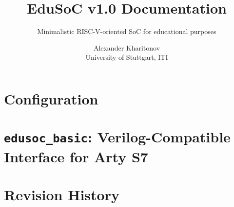\documentclass[12pt]{scrartcl}
\title{EduSoC v1.0 Documentation}
\subtitle{Minimalistic RISC-V-oriented SoC for educational purposes}
\author{Alexander Kharitonov\\University of Stuttgart, ITI}
\newcommand{\ttt}[1]{\texttt{#1}}
\begin{document}









\section{Configuration}\label{sec:config}


\appendix
\section{\ttt{edusoc\_basic}: Verilog-Compatible Interface for Arty S7}\label{sec:basic}


\section{Revision History}\label{sec:revisions}
\end{document}
